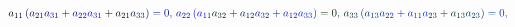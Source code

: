 \documentclass[12pt]{article}
\begin{document}
\makeatletter
\renewcommand*{\@textcolor}[3]{%
  \protect\leavevmode
  \begingroup
    \color#1{#2}#3%
  \endgroup
}
\makeatother
\begin{displaymath}
\mathcolor[RGB]{0,0,15}{a} _ { \mathcolor[RGB]{0,0,30}{1} \mathcolor[RGB]{0,0,45}{1} } \mathcolor[RGB]{0,0,60}{\left(} \mathcolor[RGB]{0,0,75}{a} _ { \mathcolor[RGB]{0,0,90}{2} \mathcolor[RGB]{0,0,105}{1} } \mathcolor[RGB]{0,0,120}{a} _ { \mathcolor[RGB]{0,0,135}{3} \mathcolor[RGB]{0,0,150}{1} } \mathcolor[RGB]{0,0,165}{+} \mathcolor[RGB]{0,0,180}{a} _ { \mathcolor[RGB]{0,0,195}{2} \mathcolor[RGB]{0,0,210}{2} } \mathcolor[RGB]{0,0,225}{a} _ { \mathcolor[RGB]{0,0,240}{3} \mathcolor[RGB]{0,0,255}{1} } \mathcolor[RGB]{0,15,0}{+} \mathcolor[RGB]{0,15,15}{a} _ { \mathcolor[RGB]{0,15,30}{2} \mathcolor[RGB]{0,15,45}{1} } \mathcolor[RGB]{0,15,60}{a} _ { \mathcolor[RGB]{0,15,75}{3} \mathcolor[RGB]{0,15,90}{3} } \mathcolor[RGB]{0,15,105}{\right)} \mathcolor[RGB]{0,15,120}{=} \mathcolor[RGB]{0,15,135}{0} \mathcolor[RGB]{0,15,150}{,} \mathcolor[RGB]{0,15,165}{\,
a} _ { \mathcolor[RGB]{0,15,180}{2} \mathcolor[RGB]{0,15,195}{2} } \mathcolor[RGB]{0,15,210}{\left(} \mathcolor[RGB]{0,15,225}{a} _ { \mathcolor[RGB]{0,15,240}{1} \mathcolor[RGB]{0,15,255}{1} } \mathcolor[RGB]{0,30,0}{a} _ { \mathcolor[RGB]{0,30,15}{3} \mathcolor[RGB]{0,30,30}{2} } \mathcolor[RGB]{0,30,45}{+} \mathcolor[RGB]{0,30,60}{a} _ { \mathcolor[RGB]{0,30,75}{1} \mathcolor[RGB]{0,30,90}{2} } \mathcolor[RGB]{0,30,105}{a} _ { \mathcolor[RGB]{0,30,120}{3} \mathcolor[RGB]{0,30,135}{2} } \mathcolor[RGB]{0,30,150}{+} \mathcolor[RGB]{0,30,165}{a} _ { \mathcolor[RGB]{0,30,180}{1} \mathcolor[RGB]{0,30,195}{2} } \mathcolor[RGB]{0,30,210}{a} _ { \mathcolor[RGB]{0,30,225}{3} \mathcolor[RGB]{0,30,240}{3} } \mathcolor[RGB]{0,30,255}{\right)} \mathcolor[RGB]{0,45,0}{=} \mathcolor[RGB]{0,45,15}{0} \mathcolor[RGB]{0,45,30}{,} \mathcolor[RGB]{0,45,45}{\,
a} _ { \mathcolor[RGB]{0,45,60}{3} \mathcolor[RGB]{0,45,75}{3} } \mathcolor[RGB]{0,45,90}{\left(} \mathcolor[RGB]{0,45,105}{a} _ { \mathcolor[RGB]{0,45,120}{1} \mathcolor[RGB]{0,45,135}{3} } \mathcolor[RGB]{0,45,150}{a} _ { \mathcolor[RGB]{0,45,165}{2} \mathcolor[RGB]{0,45,180}{2} } \mathcolor[RGB]{0,45,195}{+} \mathcolor[RGB]{0,45,210}{a} _ { \mathcolor[RGB]{0,45,225}{1} \mathcolor[RGB]{0,45,240}{1} } \mathcolor[RGB]{0,45,255}{a} _ { \mathcolor[RGB]{0,60,0}{2} \mathcolor[RGB]{0,60,15}{3} } \mathcolor[RGB]{0,60,30}{+} \mathcolor[RGB]{0,60,45}{a} _ { \mathcolor[RGB]{0,60,60}{1} \mathcolor[RGB]{0,60,75}{3} } \mathcolor[RGB]{0,60,90}{a} _ { \mathcolor[RGB]{0,60,105}{2} \mathcolor[RGB]{0,60,120}{3} } \mathcolor[RGB]{0,60,135}{\right)} \mathcolor[RGB]{0,60,150}{=} \mathcolor[RGB]{0,60,165}{0} \mathcolor[RGB]{0,60,180}{,} \mathcolor[RGB]{0,60,195}{\,
}
\end{displaymath}
\end{document}
